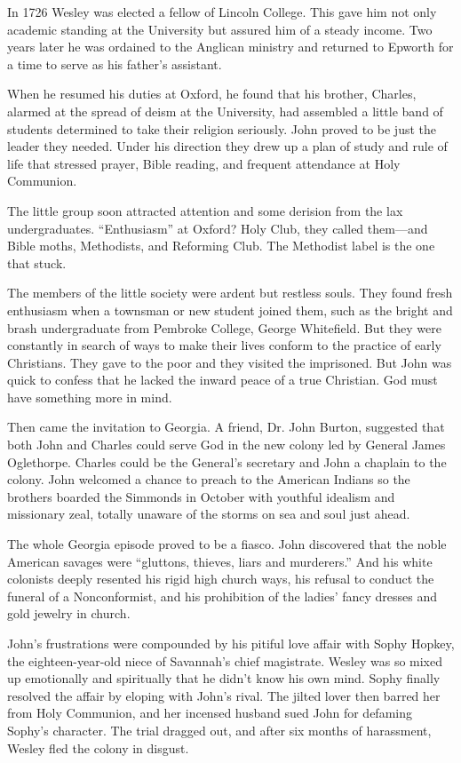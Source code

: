 In 1726 Wesley was elected a fellow of Lincoln College. This gave him not only academic standing at
the University but assured him of a steady income. Two years later he was ordained to the Anglican
ministry and returned to Epworth for a time to serve as his father’s assistant.

When he resumed his duties at Oxford, he found that his brother, Charles, alarmed at the spread of
deism at the University, had assembled a little band of students determined to take their religion
seriously. John proved to be just the leader they needed. Under his direction they drew up a plan of
study and rule of life that stressed prayer, Bible reading, and frequent attendance at Holy
Communion.

The little group soon attracted attention and some derision from the lax undergraduates.
“Enthusiasm” at Oxford? Holy Club, they called them—and Bible moths, Methodists, and Reforming Club.
The Methodist label is the one that stuck.

The members of the little society were ardent but restless souls. They found fresh enthusiasm when a
townsman or new student joined them, such as the bright and brash undergraduate from Pembroke
College, George Whitefield. But they were constantly in search of ways to make their lives conform
to the practice of early Christians. They gave to the poor and they visited the imprisoned. But John
was quick to confess that he lacked the inward peace of a true Christian. God must have something
more in mind.

Then came the invitation to Georgia. A friend, Dr. John Burton, suggested that both John and Charles
could serve God in the new colony led by General James Oglethorpe. Charles could be the General’s
secretary and John a chaplain to the colony. John welcomed a chance to preach to the American
Indians so the brothers boarded the Simmonds in October with youthful idealism and missionary zeal,
totally unaware of the storms on sea and soul just ahead.

The whole Georgia episode proved to be a fiasco. John discovered that the noble American savages
were “gluttons, thieves, liars and murderers.” And his white colonists deeply resented his rigid
high church ways, his refusal to conduct the funeral of a Nonconformist, and his prohibition of the
ladies’ fancy dresses and gold jewelry in church.

John’s frustrations were compounded by his pitiful love affair with Sophy Hopkey, the
eighteen-year-old niece of Savannah’s chief magistrate. Wesley was so mixed up emotionally and
spiritually that he didn’t know his own mind. Sophy finally resolved the affair by eloping with
John’s rival. The jilted lover then barred her from Holy Communion, and her incensed husband sued
John for defaming Sophy’s character. The trial dragged out, and after six months of harassment,
Wesley fled the colony in disgust.

